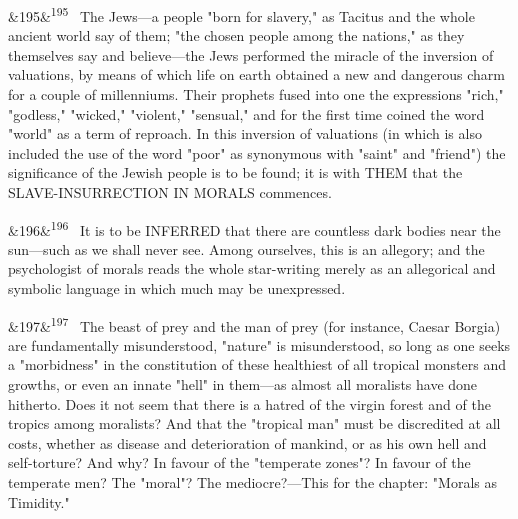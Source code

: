 \documentclass[12pt]{article}
\newcommand{\para}[1][]{\par\noindent\ifx&#1&\else\textsuperscript{\footnotesize #1}~\fi}
\begin{document}
\para[195] The Jews---a people "born for slavery," as Tacitus and the whole ancient world say of them; "the chosen people among the nations," as they themselves say and believe---the Jews performed the miracle of the inversion of valuations, by means of which life on earth obtained a new and dangerous charm for a couple of millenniums. Their prophets fused into one the expressions "rich," "godless," "wicked," "violent," "sensual," and for the first time coined the word "world" as a term of reproach. In this inversion of valuations (in which is also included the use of the word "poor" as synonymous with "saint" and "friend") the significance of the Jewish people is to be found; it is with THEM that the SLAVE-INSURRECTION IN MORALS commences.

\para[196] It is to be INFERRED that there are countless dark bodies near the sun---such as we shall never see. Among ourselves, this is an allegory; and the psychologist of morals reads the whole star-writing merely as an allegorical and symbolic language in which much may be unexpressed.

\para[197] The beast of prey and the man of prey (for instance, Caesar Borgia) are fundamentally misunderstood, "nature" is misunderstood, so long as one seeks a "morbidness" in the constitution of these healthiest of all tropical monsters and growths, or even an innate "hell" in them---as almost all moralists have done hitherto. Does it not seem that there is a hatred of the virgin forest and of the tropics among moralists? And that the "tropical man" must be discredited at all costs, whether as disease and deterioration of mankind, or as his own hell and self-torture? And why? In favour of the "temperate zones"? In favour of the temperate men? The "moral"? The mediocre?---This for the chapter: "Morals as Timidity."
\end{document}
